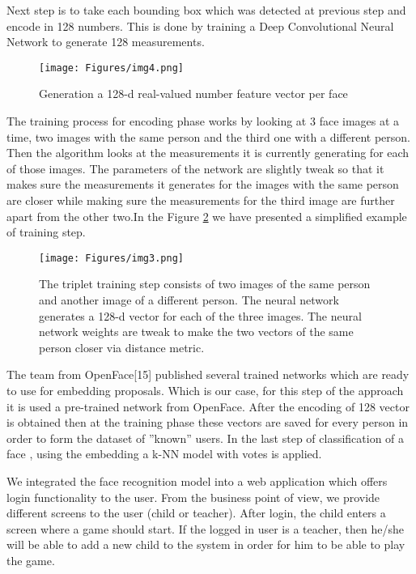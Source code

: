 \documentclass[runningheads,a4paper,11pt]{report}
\begin{document}
Next step is to take each bounding box which was detected at previous step and encode in 128 numbers. This is done by training a Deep Convolutional Neural Network to generate 128 measurements.

\begin{figure}[!htb]
    \centering
    \texttt{[image: Figures/img4.png]}
    \caption{ Generation a 128-d real-valued number feature vector per face \cite{binotuopencv}}
    \label{img4}
\end{figure}

The training process for encoding phase works by looking at 3 face images at a time, two images with the same person and the third one with a different person. Then the algorithm looks at the measurements it is currently generating for each of those images. The parameters of the network are slightly tweak so that it makes sure the measurements it generates for the images with the same person are closer while making sure the measurements for the third image are further apart from the other two.In the Figure \ref{img3} we  have presented a simplified example of training step.

 \begin{figure}[!htb]
    \centering
    \texttt{[image: Figures/img3.png]}
    \caption{ The triplet training step consists of two images of the same person and another image of a different person. The neural network generates a 128-d vector for each of the three images. The neural network weights are tweak to make the two vectors of the same person closer via distance metric.\cite{binotuopencv}}
    \label{img3}
\end{figure}

The team from OpenFace[15] published several trained networks which are ready to use for embedding proposals. Which is our case, for this step of the approach it is used a pre-trained network from OpenFace.
After the encoding of 128 vector is obtained then at the training phase these vectors are saved for every person in order to form the dataset of ''known'' users.
 In the last step of classification of a face , using the embedding a  k-NN model with votes is applied.

We integrated the face recognition model into a web application which offers login functionality to the user. From the business point of view, we provide different screens to the user (child or teacher). After login, the child enters a screen where a game should start. If the logged in user is a teacher, then he/she will be able to add a new child to the system in order for him to be able to play the game.
\end{document}
